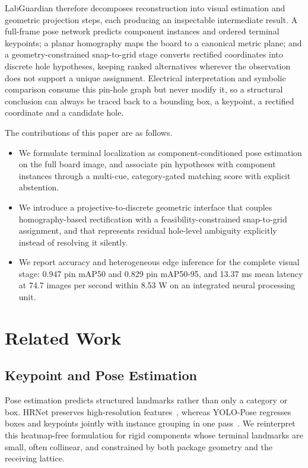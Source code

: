 \documentclass[conference]{IEEEtran}
\begin{document}
LabGuardian therefore decomposes reconstruction into visual estimation and
geometric projection steps, each producing an inspectable intermediate result. A full-frame pose network predicts component instances and
ordered terminal keypoints; a planar homography maps the board to a canonical
metric plane; and a geometry-constrained snap-to-grid stage converts rectified
coordinates into discrete hole hypotheses, keeping ranked alternatives wherever
the observation does not support a unique assignment. Electrical interpretation
and symbolic comparison consume this pin-hole graph but never modify it, so a
structural conclusion can always be traced back to a bounding box, a keypoint, a
rectified coordinate and a candidate hole.

The contributions of this paper are as follows.

\begin{itemize}
\item We formulate terminal localization as component-conditioned pose
estimation on the full board image, and associate pin hypotheses with component
instances through a multi-cue, category-gated matching score with explicit
abstention.
\item We introduce a projective-to-discrete geometric interface that couples
homography-based rectification with a feasibility-constrained snap-to-grid
assignment, and that represents residual hole-level ambiguity explicitly
instead of resolving it silently.
\item We report accuracy and heterogeneous edge inference for the complete
visual stage: 0.947 pin mAP50 and 0.829 pin mAP50-95, and 13.37 ms mean latency
at 74.7 images per second within 8.53 W on an integrated neural processing unit.
\end{itemize}

\section{Related Work}

\subsection{Keypoint and Pose Estimation}

Pose estimation predicts structured landmarks rather than only a category or
box. HRNet preserves high-resolution features~\cite{hrnet}, whereas YOLO-Pose
regresses boxes and keypoints jointly with instance grouping in one
pass~\cite{yolopose,yolo}. We reinterpret this heatmap-free formulation for rigid
components whose terminal landmarks are small, often collinear, and constrained
by both package geometry and the receiving lattice.
\end{document}
